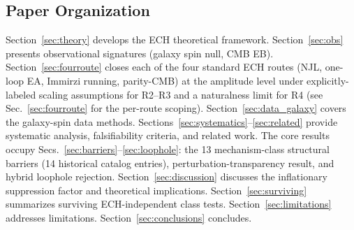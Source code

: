 \documentclass[aps,prd,twocolumn,superscriptaddress,showpacs,preprintnumbers,nofootinbib,longbibliography,floatfix]{revtex4-2}
\begin{document}
\subsection{Paper Organization}\label{sec:paporg}

Section~\ref{sec:theory} develops the ECH theoretical framework.
Section~\ref{sec:obs} presents observational signatures (galaxy spin null,
CMB EB). Section~\ref{sec:fourroute} closes each of the four standard ECH routes (NJL, one-loop EA, Immirzi running, parity-CMB) at the amplitude level under explicitly-labeled scaling assumptions for R2--R3 and a naturalness limit for R4 (see Sec.~\ref{sec:fourroute} for the per-route scoping).
Section~\ref{sec:data_galaxy} covers the galaxy-spin data methods.
Sections~\ref{sec:systematics}--\ref{sec:related} provide systematic analysis,
falsifiability criteria, and related work. The core results occupy
Secs.~\ref{sec:barriers}--\ref{sec:loophole}: the 13 mechanism-class structural barriers (14 historical catalog entries),
perturbation-transparency result, and hybrid loophole rejection.
Section~\ref{sec:discussion} discusses the inflationary suppression factor and
theoretical implications. Section~\ref{sec:surviving} summarizes surviving
ECH-independent class tests. Section~\ref{sec:limitations} addresses limitations.
Section~\ref{sec:conclusions} concludes.
\end{document}
